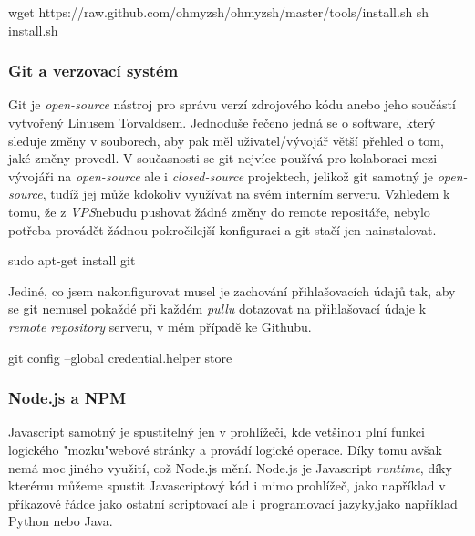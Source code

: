 \documentclass[12pt,a4paper]{report}
\begin{document}
  \begin{bash}
    wget https://raw.github.com/ohmyzsh/ohmyzsh/master/tools/install.sh
    sh install.sh
  \end{bash}

  \subsubsection{Git a verzovací systém}
  Git je \emph{open-source} nástroj pro správu verzí zdrojového kódu anebo jeho součástí vytvořený Linusem Torvaldsem. 
  Jednoduše řečeno jedná se o software, který sleduje změny v souborech, aby pak měl uživatel/vývojář 
  větší přehled o tom, jaké změny provedl. V současnosti se git nejvíce používá pro kolaboraci mezi vývojáři na \emph{open-source}
   ale i \emph{closed-source} projektech, jelikož git samotný je \emph{open-source}, tudíž jej může kdokoliv využívat na svém interním serveru.
  Vzhledem k tomu, že z \emph{VPS}nebudu pushovat žádné změny do remote repositáře, nebylo potřeba provádět žádnou pokročilejší konfiguraci 
  a git stačí jen nainstalovat.
  \begin{bash}
    sudo apt-get install git
  \end{bash}
  Jediné, co jsem nakonfigurovat musel je zachování přihlašovacích údajů tak, aby se git nemusel pokaždé při každém \emph{pullu} dotazovat
   na přihlašovací údaje k \emph{remote repository} serveru, v mém případě ke Githubu.
  \begin{bash}
    git config --global credential.helper store
  \end{bash}
  \subsubsection{Node.js a NPM}
  Javascript samotný je spustitelný jen v prohlížeči, kde vetšinou plní funkci logického "mozku"\space webové stránky a provádí logické operace. 
  Díky tomu avšak nemá moc jiného využití, což Node.js mění.
  Node.js je Javascript \emph{runtime}, díky kterému můžeme spustit Javascriptový 
  kód i mimo prohlížeč, jako například v příkazové řádce jako ostatní scriptovací ale i programovací jazyky,jako například Python nebo Java.
 
\end{document}
